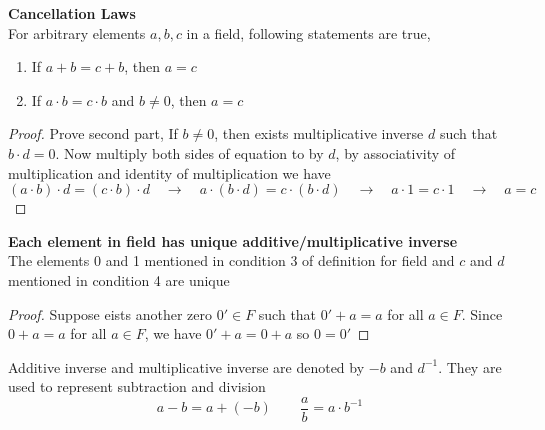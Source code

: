 \documentclass[11pt]{article}
\begin{document}
\begin{theorem*}
    \textbf{Cancellation Laws} \\
    For arbitrary elements $a,b,c$ in a field, following statements are true, 
    \begin{enumerate}
        \item If $a+b = c+b$, then $a=c$
        \item If $a\cdot b = c\cdot b$ and $b\neq 0$, then $a=c$
    \end{enumerate}
    \begin{proof}
        Prove second part, If $b\neq 0$, then exists multiplicative inverse $d$ such that $b\cdot d = 0$. Now multiply both sides of equation to by $d$, by associativity of multiplication and identity of multiplication we have 
        \[
            (a\cdot b) \cdot d = (c\cdot b)\cdot d \quad\to\quad 
            a \cdot (b\cdot d) = c\cdot (b\cdot d) \quad\to\quad 
            a \cdot 1 = c\cdot 1 \quad\to\quad 
            a = c
        \]
    \end{proof}
\end{theorem*}

\begin{corollary*}
    \textbf{Each element in field has unique additive/multiplicative inverse} \\
    The elements 0 and 1 mentioned in condition 3 of definition for field and $c$ and $d$ mentioned in condition 4 are unique
    \begin{proof}
        Suppose eists another zero $0'\in F$ such that $0' + a = a$ for all $a\in F$. Since $0+a = a$ for all $a\in F$, we have $0' + a = 0 + a$ so $0 = 0'$
    \end{proof}
    Additive inverse and multiplicative inverse are denoted by $-b$ and $d^{-1}$. They are used to represent subtraction and division
    \[
        a - b = a + (-b) \quad \quad
        \frac{a}{b} = a\cdot b^{-1}    
    \]
\end{corollary*}
\end{document}
